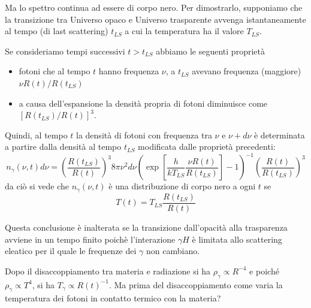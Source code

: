 Ma lo spettro continua ad essere di corpo nero. Per dimostrarlo, supponiamo che
la transizione tra Universo opaco e Universo trasparente avvenga istantaneamente
al tempo (di last scattering) $t_{LS}$ a cui la temperatura ha il valore
$T_{LS}$.

Se consideriamo tempi successivi $t>t_{LS}$ abbiamo le seguenti proprietà
\begin{itemize}
\item fotoni che al tempo $t$ hanno frequenza $\nu$, a $t_{LS}$ avevano
  frequenza (maggiore) $\nu R(t)/R(t_{LS})$
\item a causa dell'espansione la densità propria di fotoni diminuisce come
  $[R(t_{LS})/R(t)]^3$.
\end{itemize}
Quindi, al tempo $t$ la densità di fotoni con frequenza tra $\nu$ e $\nu+d\nu$ è
determinata a partire dalla densità al tempo $t_{LS}$ modificata dalle proprietà
precedenti:
\begin{equation}
  n_{\gamma}(\nu, t) d\nu = \left( \frac {R(t_{LS})} {R(t)} \right)^3
  8 \pi \nu^2 d \nu
  \left( \exp \left[ \frac {h} {k T_{LS}} \frac{\nu R(t)}{R(t_{LS})} \right] -1
  \right)^{-1} \left( \frac {R(t)} {R(t_{LS})} \right)^3
\end{equation}
da ciò si vede che $n_{\gamma}(\nu,t)$ è una distribuzione di corpo nero a ogni
$t$ se
\begin{equation}
  T(t) = T_{LS} \frac {R(t_{LS})} {R(t)}
\end{equation}

Questa conclusione è inalterata se la transizione dall'opacità alla trasparenza
avviene in un tempo finito poichè l'interazione $\gamma H$ è limitata allo
scattering eleatico per il quale le frequenze dei $\gamma$ non cambiano.

Dopo il disaccoppiamento tra materia e radiazione si ha $\rho_{\gamma} \propto
R^{-4}$ e poiché $\rho_{\gamma} \propto T^4$, si ha $T_{\gamma} \propto
R(t)^{-1}$.  Ma prima del disaccoppiamento come varia la temperatura dei fotoni
in contatto termico con la materia?

